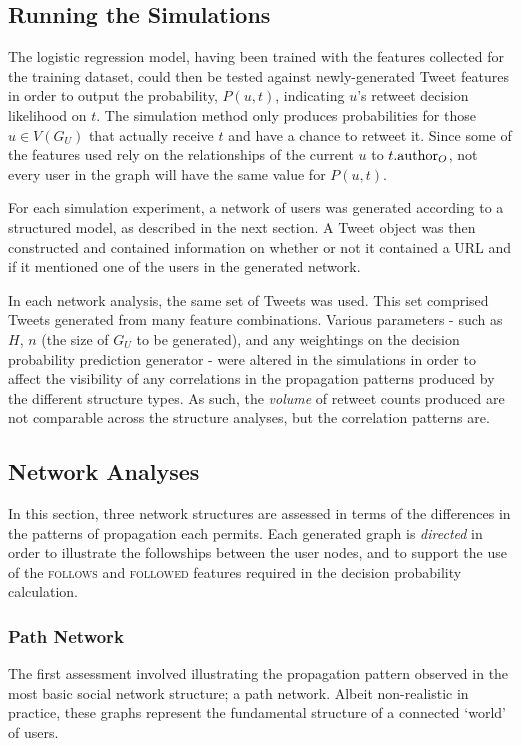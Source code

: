 \subsection{Running the Simulations}
The logistic regression model, having been trained with the features collected for the training dataset, could then be tested against newly-generated Tweet features in order to output the probability, $P(u,t)$, indicating $u$'s retweet decision likelihood on $t$. The simulation method only produces probabilities for those $u \in V(G_U)$ that actually receive $t$ and have a chance to retweet it. Since some of the features used rely on the relationships of the current $u$ to $t.\textrm{author}_O$, not every user in the graph will have the same value for $P(u,t)$.

For each simulation experiment, a network of users was generated according to a structured model, as described in the next section. A Tweet object was then constructed and contained information on whether or not it contained a URL and if it mentioned one of the users in the generated network. 

In each network analysis, the same set of Tweets was used. This set comprised Tweets generated from many feature combinations. Various parameters - such as $H$, $n$ (the size of $G_U$ to be generated), and any weightings on the decision probability prediction generator - were altered in the simulations in order to affect the visibility of any correlations in the propagation patterns produced by the different structure types. As such, the \textit{volume} of retweet counts produced are not comparable across the structure analyses, but the correlation patterns are.


\subsection{Network Analyses}
In this section, three network structures are assessed in terms of the differences in the patterns of propagation each permits. Each generated graph is \textit{directed} in order to illustrate the followships between the user nodes, and to support the use of the \textsc{follows} and \textsc{followed} features required in the decision probability calculation.


\subsubsection{Path Network}
The first assessment involved illustrating the propagation pattern observed in the most basic social network structure; a path network. Albeit non-realistic in practice, these graphs represent the fundamental structure of a connected `world' of users.


